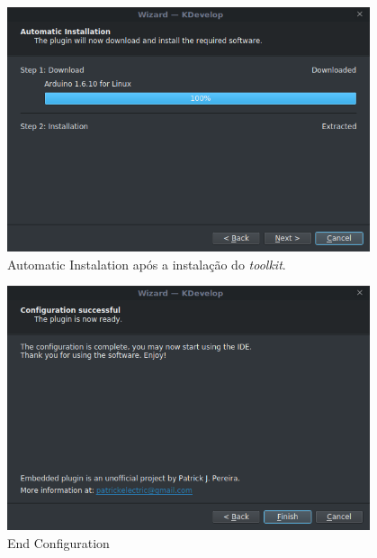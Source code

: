 \begin{figure}[!htb]
  \centering
  \caption[Automatic Instalation pós instalação]{Automatic Instalation após a instalação do \textit{toolkit}.}
  \label{fig:kdevelopinstaller22}
  \includegraphics[width=0.95\textwidth]{figuras/kdevelopInstaller22.png}
\end{figure}

\begin{figure}[!htb]
  \centering
  \caption[End Configuration]{End Configuration}
  \label{fig:kdevelopinstaller3}
  \includegraphics[width=0.95\textwidth]{figuras/kdevelopInstaller3.png}
\end{figure}

